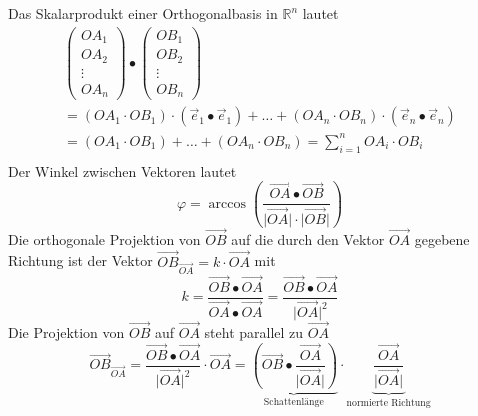 Das Skalarprodukt einer Orthogonalbasis in $\mathbb{R}^n$ lautet
\begin{equation}
\boxed{\begin{array}{l}
\begin{pmatrix}OA_1\\OA_2\\\vdots\\OA_n\end{pmatrix}\bullet \begin{pmatrix}OB_1\\OB_2\\\vdots\\OB_n\end{pmatrix}\\
=\left(OA_1\cdot OB_1\right)\cdot\left(\overrightarrow{e}_1\bullet \overrightarrow{e}_1\right)+\dotso+\left(OA_n\cdot OB_n\right)\cdot\left(\overrightarrow{e}_n\bullet \overrightarrow{e}_n\right)\\
=\left(OA_1\cdot OB_1\right)+\dotso+\left(OA_n\cdot OB_n\right)=\displaystyle \sum_{i=1}^nOA_i\cdot OB_i\\
\end{array}}
\end{equation}
Der Winkel zwischen Vektoren lautet
\begin{equation}
\boxed{\varphi=\arccos\left(\dfrac{\overrightarrow{OA}\bullet \overrightarrow{OB}}{\Big\vert\overrightarrow{OA}\Big\vert\cdot \Big\vert\overrightarrow{OB}\Big\vert}\right)}
\end{equation}
Die orthogonale Projektion von $\overrightarrow{OB}$ auf die durch den Vektor $\overrightarrow{OA}$ gegebene Richtung ist der Vektor $\overrightarrow{OB}_{\overrightarrow{OA}}=k\cdot \overrightarrow{OA}$ mit
\begin{equation}
\boxed{k=\dfrac{\overrightarrow{OB}\bullet \overrightarrow{OA}}{\overrightarrow{OA}\bullet \overrightarrow{OA}}=\dfrac{\overrightarrow{OB}\bullet \overrightarrow{OA}}{\Big\vert\overrightarrow{OA}\Big\vert^2}}
\end{equation}
Die Projektion von $\overrightarrow{OB}$ auf $\overrightarrow{OA}$ steht parallel zu $\overrightarrow{OA}$
\begin{equation}
\boxed{\overrightarrow{OB}_{\overrightarrow{OA}}=\dfrac{\overrightarrow{OB}\bullet \overrightarrow{OA}}{\Big\vert\overrightarrow{OA}\Big\vert^2}\cdot \overrightarrow{OA}=\underbrace{\left(\overrightarrow{OB}\bullet \dfrac{\overrightarrow{OA}}{\Big\vert\overrightarrow{OA}\Big\vert}\right)}_{\text{Schattenlänge}}\cdot \underbrace{\dfrac{\overrightarrow{OA}}{\Big\vert\overrightarrow{OA}\Big\vert}}_{\text{normierte Richtung}}}
\end{equation}
